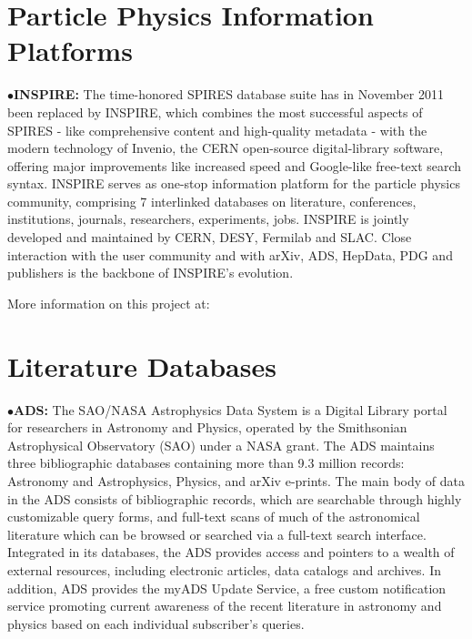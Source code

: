            \item{}
\medskip


\section{Particle Physics Information Platforms}%


\item{$\bullet$}{\bf INSPIRE:}
The time-honored SPIRES database suite has in November 2011 been replaced by INSPIRE, which combines the most successful aspects of SPIRES - like comprehensive content and high-quality metadata - with the modern technology of Invenio, the CERN open-source digital-library software, offering major improvements like increased speed and Google-like free-text search syntax. INSPIRE serves as one-stop information platform for the particle physics community, comprising 7 interlinked databases on literature, conferences, institutions, journals, researchers, experiments, jobs. INSPIRE is jointly developed and maintained by CERN, DESY, Fermilab and SLAC. Close interaction with the user community and with arXiv, ADS, HepData, PDG and publishers is the backbone of INSPIRE's evolution. 

	\item{}

\item{}More information on this project at:

	\item{}
	\item{}
	\item{}


\medskip

\section{Literature Databases}%

\item{$\bullet$}{\bf ADS:} 
The SAO/NASA Astrophysics Data System is a Digital Library portal for researchers in Astronomy and Physics, operated by the Smithsonian Astrophysical Observatory (SAO) under a NASA grant. The ADS maintains three bibliographic databases containing more than 9.3 million records: Astronomy and Astrophysics, Physics, and arXiv e-prints. The main body of data in the ADS consists of bibliographic records, which are searchable through highly customizable query forms, and full-text scans of much of the astronomical literature which can be browsed or searched via a full-text search interface. Integrated in its databases, the ADS provides access and pointers to a wealth of external resources, including electronic articles, data catalogs and archives. In addition, ADS provides the myADS Update Service, a free custom notification service promoting current awareness of the recent literature in astronomy and physics based on each individual subscriber's queries.

